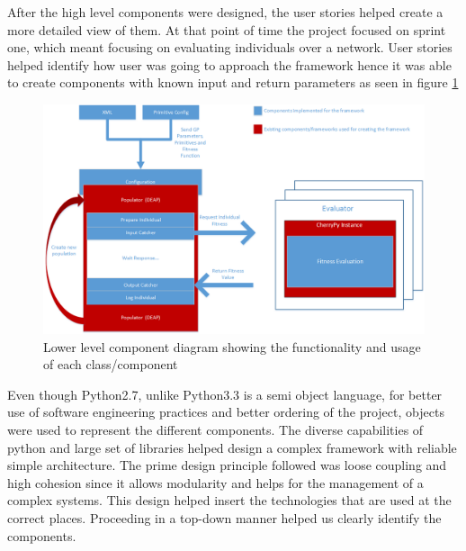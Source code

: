After the high level components were designed, the user stories helped create a more detailed view of them. At that point of
time the project focused on sprint one, which meant focusing on evaluating individuals over a network.
User stories helped identify how user was going to approach the framework hence it was able to create components with known
input and return parameters as seen in figure \ref{fig:firstSprint}


\begin{figure}[htp]
\centering
\includegraphics[scale=0.6]{Figures/FirstSprint.png}
\caption{Lower level component diagram showing the functionality and usage of each class/component}
\label{fig:firstSprint}
\end{figure}


Even though Python2.7, unlike Python3.3 is a semi object language, for better use of software engineering practices and better ordering of the project,
objects were used to represent the different components. The diverse capabilities of python and large set of libraries helped design a complex framework with reliable simple architecture. The prime design principle followed
was loose coupling and high cohesion since it allows modularity and helps for the management of a complex systems. This design helped insert the technologies that are used at the correct
places. Proceeding in a top-down manner helped us clearly identify the components.



